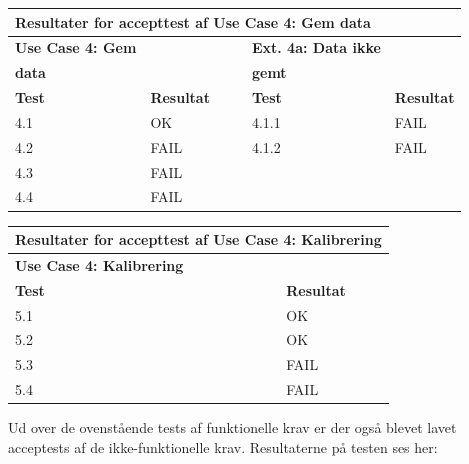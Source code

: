 \begin{table}[h!]
	\centering
	\begin{tabular}{llllll}
		\multicolumn{6}{l}{\cellcolor[HTML]{187ABD}\textbf{Resultater for accepttest af Use Case 4: Gem data}} \\ \hline
		\textbf{Use Case 4: Gem} & \multicolumn{1}{l|}{} &  & \multicolumn{1}{l|}{} & \textbf{Ext. 4a: Data ikke} &  \\
		\textbf{data} & \multicolumn{1}{l|}{} &  & \multicolumn{1}{l|}{} & \textbf{gemt} &  \\ \cline{1-2} \cline{5-6} 
		\textbf{Test} & \multicolumn{1}{l|}{\textbf{Resultat}} &  & \multicolumn{1}{l|}{} & \textbf{Test} & \textbf{Resultat} \\ \cline{1-2} \cline{5-6} 
		4.1 & \multicolumn{1}{l|}{OK} &  & \multicolumn{1}{l|}{} & 4.1.1 & FAIL \\ \cline{1-2} \cline{5-6} 
		4.2 & \multicolumn{1}{l|}{FAIL} &  & \multicolumn{1}{l|}{} & 4.1.2 & FAIL \\ \cline{1-2} \cline{5-6} 
		4.3 & \multicolumn{1}{l|}{FAIL} &  & \multicolumn{1}{l|}{} &  &  \\ \cline{1-2} \cline{5-6} 
		4.4 & \multicolumn{1}{l|}{FAIL} &  & \multicolumn{1}{l|}{} &  & 
	\end{tabular}
\end{table}

\clearpage

\begin{table}[h!]
	\centering
	\begin{tabular}{ll}
		\multicolumn{2}{l}{\cellcolor[HTML]{187ABD}\textbf{Resultater for accepttest af Use Case 4: Kalibrering}} \\ \hline
		\multicolumn{1}{l|}{\textbf{Use Case 4: Kalibrering}} &  \\ \hline
		\multicolumn{1}{l|}{\textbf{Test}} & \textbf{Resultat} \\ \hline
		\multicolumn{1}{l|}{5.1} & OK \\ \hline
		\multicolumn{1}{l|}{5.2} & OK \\ \hline
		\multicolumn{1}{l|}{5.3} & FAIL \\ \hline
		\multicolumn{1}{l|}{5.4} & FAIL
	\end{tabular}
\end{table}

Ud over de ovenstående tests af funktionelle krav er der også blevet lavet acceptests af de ikke-funktionelle krav. Resultaterne på testen ses her: 

